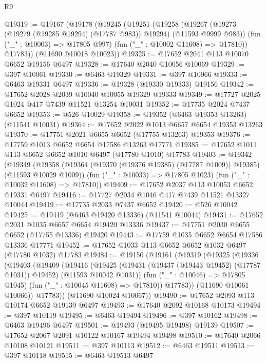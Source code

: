 \begin{lexlean}{R9}
\begin{coremodule}
{{{{{{{{{{{{{{{{{{{{{{{{{{{{{{{{{{{{{{{{{{{{{{{{{{{{{{{{{{{{{{{{{{{{{{{{{{{{{{{{{{{{@19319 := @19167
    (@19178
      (@19245
        (@19251
          (@19258
            (@19267 (@19273 (@19279 (@19285 @19294) (@17787 @983)) @19294) (@11593 @9999 @983))
            (fun ("_" : @10003) => @17805 @997)
            (fun ("_" : @10002 @11608) => @17810))
          @17783))
      (@11690 @10018 @10023))
@19325 := @17652 @2041 @113 @10070 @6652 @19156 @6497
@19328 := @17640 @2040 @10056 @10069
@19329 := @397 @10061
@19330 := @6463 @19329
@19331 := @397 @10066
@19333 := @6463 @19331 @6497
@19336 := @19328 (@19330 @19333) @19156
@19342 := @17652 @2028 @2039 @10040 @10055 @19329 @19333
@19349 := @17727 @2025 @1024 @417 @7439 @11521 @13254 @10031
@19352 := @17735 @2024 @7437 @6652
@19353 := @526 @10029
@19358 := @19352 (@6463 @19353 @13263) (@11541 @10031)
@19364 := @17652 @2022 @1013 @6657 @6654 @19353 @13263
@19370 := @17751 @2021 @6655 @6652 (@17755 @13263) @19353
@19376 := @17759 @1013 @6652 @6654 @17586 @13263 @17771
@19385 := @17652 @1011 @113 @6652 @6652 @1010 @6497 (@17780 @1010) @17783
@19403 := @19342
    (@19349
      (@19358 (@19364 (@19370 (@19376 @19385) (@17787 @1009)) @19385) (@11593 @10029 @1009))
      (fun ("_" : @10033) => @17805 @1023)
      (fun ("_" : @10032 @11608) => @17810))
@19409 := @17652 @2037 @113 @10053 @6652 @19331 @6497
@19416 := @17727 @2034 @1046 @417 @7439 @11521 @13327 @10044
@19419 := @17735 @2033 @7437 @6652
@19420 := @526 @10042
@19425 := @19419 (@6463 @19420 @13336) (@11541 @10044)
@19431 := @17652 @2031 @1035 @6657 @6654 @19420 @13336
@19437 := @17751 @2030 @6655 @6652 (@17755 @13336) @19420
@19443 := @17759 @1035 @6652 @6654 @17586 @13336 @17771
@19452 := @17652 @1033 @113 @6652 @6652 @1032 @6497 (@17780 @1032) @17783
@19484 := @19150
    (@19161
      (@19319
        (@19325
          (@19336
            (@19403
              (@19409
                (@19416
                  (@19425
                    (@19431 (@19437 (@19443 @19452) (@17787 @1031)) @19452)
                    (@11593 @10042 @1031))
                  (fun ("_" : @10046) => @17805 @1045)
                  (fun ("_" : @10045 @11608) => @17810))
                @17783))
            (@11690 @10061 @10066))
          @17783))
      (@11690 @10024 @10067))
@19490 := @17652 @2093 @113 @10174 @6652 @19139 @6497
@19493 := @17640 @2092 @10168 @10173
@19494 := @397 @10119
@19495 := @6463 @19494
@19496 := @397 @10162
@19498 := @6463 @19496 @6497
@19501 := @19493 (@19495 @19498) @19139
@19507 := @17652 @2067 @2091 @10122 @10167 @19494 @19498
@19510 := @17640 @2066 @10108 @10121
@19511 := @397 @10113
@19512 := @6463 @19511
@19513 := @397 @10118
@19515 := @6463 @19513 @6497
}}}}}}}}}}}}}}}}}}}}}}}}}}}}}}}}}}}}}}}}}}}}}}}}}}}}}}}}}}}}}}}}}}}}}}}}}}}}}}}}}}}}
\end{coremodule}
\end{lexlean}
